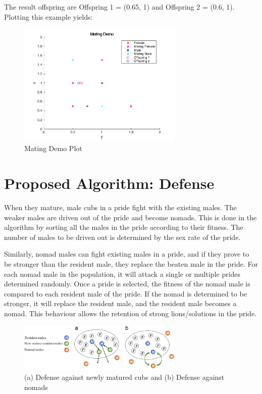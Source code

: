 The result offspring are Offspring 1 = (0.65, 1) and Offspring 2 = (0.6, 1). Plotting this example yields:
\begin{figure}[H]
\begin{center}
\includegraphics[width=0.7\textwidth]{img/mating/matingdemooutput}
\caption{Mating Demo Plot}
\end{center}
\end{figure}

\section{Proposed Algorithm: Defense}
When they mature, male cubs in a pride fight with the existing males. The weaker males are driven out of the pride and become nomads. This is done in the algorithm by sorting all the males in the pride according to their fitness. The number of males to be driven out is determined by the sex rate of the pride.

Similarly, nomad males can fight existing males in a pride, and if they prove to be stronger than the resident male, they replace the beaten male in the pride. For each nomad male in the population, it will attack a single or multiple prides determined randomly. Once a pride is selected, the fitness of the nomad male is compared to each resident male of the pride. If the nomad is determined to be stronger, it will replace the resident male, and the resident male becomes a nomad. This behaviour allows the retention of strong lions/solutions in the pride.

\begin{figure}[H]
\begin{center}
\includegraphics[width=0.7\textwidth]{img/defense/defense}
\caption{(a) Defense against newly matured cubs and (b) Defense against nomads\cite{loa_2016}}
\end{center}
\end{figure}

